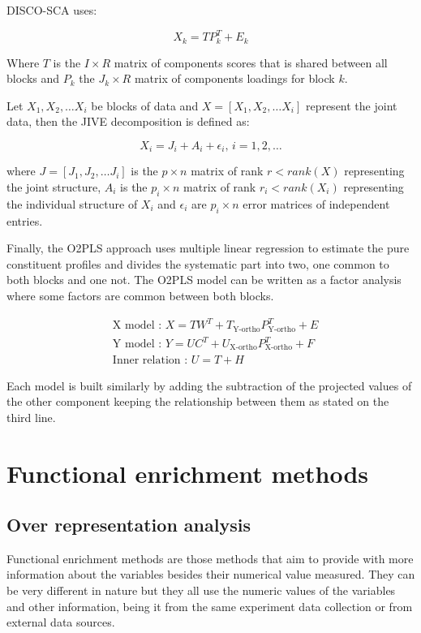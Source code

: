 \documentclass[
  12pt,
  a4paper,
  twoside,
  openright]{book}
\begin{document}
DISCO-SCA uses:

\[
X_k = TP_k ^ T + E_k
\]

Where \(T\) is the \(I \times R\) matrix of components scores that is shared between all blocks and \(P_k\) the \(J_k \times R\) matrix of components loadings for block \(k\).

Let \(X_1,X_2, \dots X_i\) be blocks of data and \(X=[X_1,X_2, \dots X_i]\) represent the joint data, then the JIVE decomposition is defined as:

\[X_i=J_i+A_i+\epsilon_i \text{, }i = 1,2, \dots\]

where \(J=[J_1,J_2, \dots J_i]\) is the \(p \times n\) matrix of rank \(r<rank(X)\) representing the joint structure, \(A_i\) is the \(p_i\times n\) matrix of rank \(r_i < rank(X_i)\) representing the individual structure of \(X_i\) and \(\epsilon_i\) are \(p_i \times n\) error matrices of independent entries.

Finally, the O2PLS approach uses multiple linear regression to estimate the pure constituent profiles and divides the systematic part into two, one common to both blocks and one not.
The O2PLS model can be written as a factor analysis where some factors are common between both blocks.

\[
\begin{aligned}
& \text{X model : } X = TW ^ T + T_{\text{Y-ortho}} P ^ T_{\text{Y-ortho}} + E \\
& \text{Y model : } Y = UC ^ T + U_{\text{X-ortho}} P ^ T_{\text{X-ortho}} + F \\
& \text{Inner relation : } U = T + H
\end{aligned}
\]

Each model is built similarly by adding the subtraction of the projected values of the other component keeping the relationship between them as stated on the third line.

\hypertarget{functional-enrichment-methods}{%
\section{Functional enrichment methods}\label{functional-enrichment-methods}}

\hypertarget{ORA}{%
\subsection{Over representation analysis}\label{ORA}}

Functional enrichment methods are those methods that aim to provide with more information about the variables besides their numerical value measured.
They can be very different in nature but they all use the numeric values of the variables and other information, being it from the same experiment data collection or from external data sources.
\end{document}
